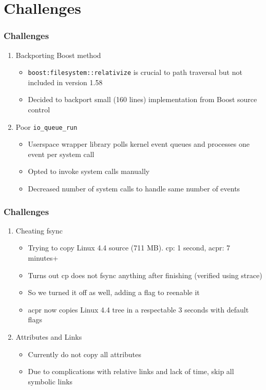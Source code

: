 \documentclass{beamer}
\begin{document}
\section{Challenges}
\begin{frame}
    \frametitle{Challenges}
    \begin{enumerate}[1.]
        \item{Backporting Boost method }
            \begin{itemize}
                \item{\texttt{boost:filesystem::relativize} is crucial to path
                        traversal but not included in version 1.58 }
                \item{Decided to backport small (160 lines) implementation from
                        Boost source control }
            \end{itemize}
        \item{Poor \texttt{io\_queue\_run} }
            \begin{itemize}
                \item{Userspace wrapper library polls kernel event queues and processes one event per system call }
                \item{Opted to invoke system calls manually }
                \item{Decreased number of system calls to handle same number of events}
            \end{itemize}
    \end{enumerate}
\end{frame}

\begin{frame}
\frametitle{Challenges}
\begin{enumerate}[1.]
	\item{Cheating fsync}
	\begin{itemize}
		\item{Trying to copy Linux 4.4 source (711 MB). cp: 1 second, acpr: 7 minutes+}
		\item{Turns out cp does not fsync anything after finishing (verified using strace)}
		\item{So we turned it off as well, adding a flag to reenable it}
		\item{acpr now copies Linux 4.4 tree in a respectable 3 seconds with default flags}
	\end{itemize}
	\item{Attributes and Links}
	\begin{itemize}
		\item{Currently do not copy all attributes}
		\item{Due to complications with relative links and lack of time, skip all symbolic links}
	\end{itemize}
	
\end{enumerate}
\end{frame}
\end{document}
